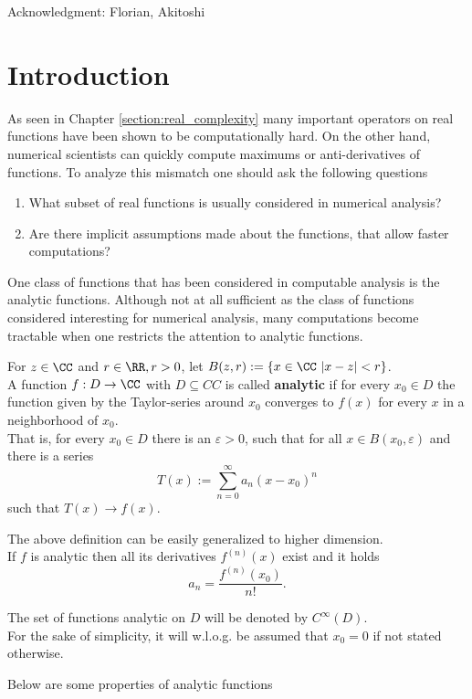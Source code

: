 	Acknowledgment: Florian, Akitoshi
	\section{Introduction}
		As seen in Chapter \ref{section:real_complexity} many important operators 
		on real functions have been shown to be computationally hard.
		On the other hand, numerical scientists can quickly compute maximums or anti-derivatives of functions.
		To analyze this mismatch one should ask the following questions
		\begin{enumerate}
			\item What subset of real functions is usually considered in numerical analysis?
			\item Are there implicit assumptions made about the functions, that allow faster computations? 
		\end{enumerate}
		One class of functions that has been considered in computable analysis is the analytic functions.
		Although not at all sufficient as the class of functions considered interesting for numerical analysis, 
		many computations become tractable when one restricts the attention to analytic functions.
		\begin{definition}
			For $z \in \CC$ and $r \in \RR, r > 0$, let $B(z,r) := \{ x \in \CC \,\, | x - z | < r\}$. \\
			A function $f: D \to \CC$ with $D \subseteq CC$ is called \textbf{analytic} if for every $x_0 \in D$ 
			the function given by the Taylor-series around $x_0$ converges to $f(x)$ for every $x$ in a neighborhood of 
			$x_0$. \\
			That is, for every $x_0 \in D$ there is an $\varepsilon > 0$, such that for all $x \in B(x_0, \varepsilon)$ and there is a series
			$$ T(x) := \sum_{n=0}^{\infty} a_n(x-x_0)^n$$
			such that $T(x) \rightarrow f(x)$.

		\end{definition}
		The above definition can be easily generalized to higher dimension. \\
		If $f$ is analytic then all its derivatives $f^{(n)}(x)$ exist and it holds
		$$ a_n = \frac{f^{(n)}(x_0)}{n!}. $$    

		The set of functions analytic on $D$ will be denoted by $C^\infty(D)$. \\		
		For the sake of simplicity, it will w.l.o.g. be assumed that $x_0 = 0$ if not stated otherwise.
		
		Below are some properties of analytic functions

